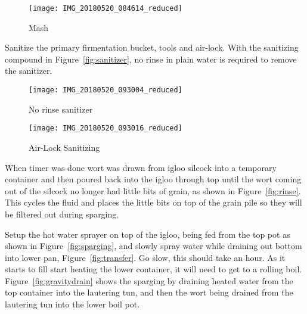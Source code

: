 \begin{figure}[H]
  \centering
  \texttt{[image: IMG\_20180520\_084614\_reduced]}
  \caption{Mash}\label{fig:mash}
\end{figure}

\FloatBarrier{}
\FloatBarrier{}

Sanitize the primary firmentation bucket, tools and air-lock.  With the sanitizing compound in Figure~\ref{fig:sanitizer}, no rinse in plain water is required to remove the sanitizer.

\begin{figure}[H]
\begin{minipage}{0.45\textwidth}
  \centering
  \texttt{[image: IMG\_20180520\_093004\_reduced]}
  \caption{No rinse sanitizer}\label{fig:sanitizer}
\end{minipage}\hfill
\begin{minipage}{0.45\textwidth}
  \centering
  \texttt{[image: IMG\_20180520\_093016\_reduced]}
  \caption{Air-Lock Sanitizing}\label{fig:airlock}
\end{minipage}
\end{figure}

\FloatBarrier{}
\FloatBarrier{}

When timer was done wort was drawn from igloo silcock into a temporary container and then poured back into the igloo through top until the wort coming out of the silcock no longer had little bits of grain, as shown in Figure~\ref{fig:rinse}.  This cycles the fluid and places the little bits on top of the grain pile so they will be filtered out during sparging.

Setup the hot water sprayer on top of the igloo, being fed from the top pot as shown in Figure~\ref{fig:sparging}, and slowly spray water while draining out bottom into lower pan, Figure~\ref{fig:transfer}.  Go slow, this should take an hour.  As it starts to fill start heating the lower container, it will need to get to a rolling boil.  Figure~\ref{fig:gravitydrain} shows the sparging by draining heated water from the top container into the lautering tun, and then the wort being drained from the lautering tun into the lower boil pot.

